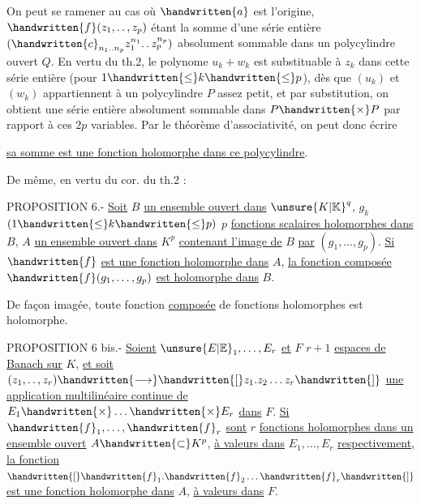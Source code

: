On peut se ramener au cas où $\handwritten{a}$ est l'origine, $\handwritten{f}(z_1,\ldotp\ldotp,z_p)$ étant la somme d'une série entière $(\handwritten{c}_{n_1\ldotp\ldotp n_p}z_1^{n_1}\ldotp\ldotp z_p^{n_p})$ absolument sommable dans un polycylindre ouvert $Q$. En vertu du th.2, le polynome $u_k+w_k$ est substituable à $z_k$ dans cette série entière (pour $1\handwritten{\leq}k\handwritten{\leq}p$), dès que $(u_k)$ et $(w_k)$ appartiennent à un polycylindre $P$ assez petit, et par substitution, on obtient une série entière absolument sommable dans $P\handwritten{\times}P$ par rapport à ces $2p$ variables. Par le théorème d'associativité, on peut donc écrire

\uline{sa somme est une fonction holomorphe dans ce polycylindre}.

De même, en vertu du cor. du th.2 :

PROPOSITION 6.- \uline{Soit} $B$ \uline{un ensemble ouvert dans} ${\unsure{K|\mathbb{K}}}^{q}$, $g_k$ $(1\handwritten{\leq}k\handwritten{\leq}p)$ $p$ \uline{fonctions scalaires holomorphes dans} $B$, $A$ \uline{un ensemble ouvert dans} $K^{p}$ \uline{contenant l'image de} $B$ \uline{par} $(g_1,\ldots,g_p)$. \uline{Si} $\handwritten{f}$ \uline{est une fonction holomorphe dans} $A$, \uline{la fonction composée} $\handwritten{f}(g_1,\ldots,g_p)$ \uline{est holomorphe dans} $B$.

De façon imagée, toute fonction \uline{composée} de fonctions holomorphes est holomorphe.

PROPOSITION 6 bis.- \uline{Soient} $\unsure{E|\mathbb{E}}_1,\ldots,E_r$ \uline{et} $F$ $r+1$ \uline{espaces de Banach sur} $K$, \uline{et soit} $(z_1,\ldotp\ldotp,z_r)\handwritten{\longrightarrow}\handwritten{[}z_1.z_2\ldots z_r\handwritten{]}$ \uline{une application multilinéaire continue de} $E_1\handwritten{\times}\ldots\handwritten{\times}E_r$ \uline{dans} $F$. \uline{Si} $\handwritten{f}_1,\ldots,\handwritten{f}_r$ \uline{sont} $r$ \uline{fonctions holomorphes dans un ensemble ouvert} $A\handwritten{\subset}K^p$, \uline{à valeurs dans} $E_1,\ldots,E_r$ \uline{respectivement}, \uline{la fonction} $\handwritten{[}\handwritten{f}_1.\handwritten{f}_2\ldots\handwritten{f}_r\handwritten{]}$ \uline{est une fonction holomorphe dans} $A$, \uline{à valeurs \handwritten{/}dans} $F$.

